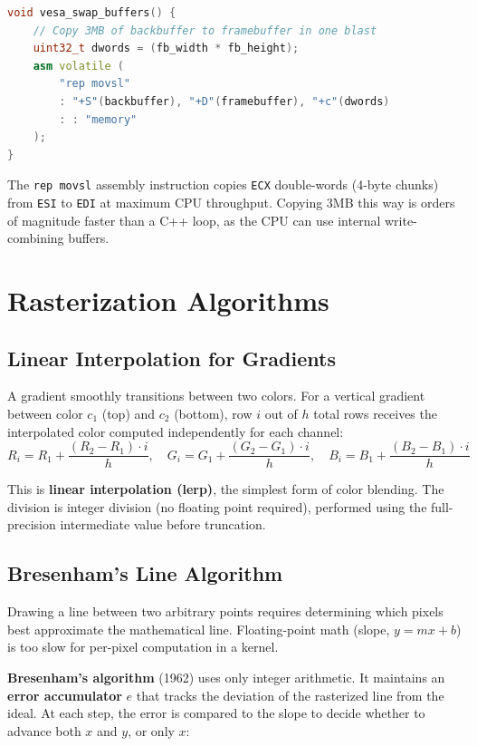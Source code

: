 \documentclass[12pt,a4paper]{report}
\begin{document}
\begin{lstlisting}[language=C++, title=kernel/vesa.cpp]
void vesa_swap_buffers() {
    // Copy 3MB of backbuffer to framebuffer in one blast
    uint32_t dwords = (fb_width * fb_height);
    asm volatile (
        "rep movsl"
        : "+S"(backbuffer), "+D"(framebuffer), "+c"(dwords)
        : : "memory"
    );
}
\end{lstlisting}

The \texttt{rep movsl} assembly instruction copies \texttt{ECX} double-words (4-byte
chunks) from \texttt{ESI} to \texttt{EDI} at maximum CPU throughput. Copying 3MB this
way is orders of magnitude faster than a C++ loop, as the CPU can use internal
write-combining buffers.

\section{Rasterization Algorithms}

\subsection{Linear Interpolation for Gradients}

A gradient smoothly transitions between two colors. For a vertical gradient between
color $c_1$ (top) and $c_2$ (bottom), row $i$ out of $h$ total rows receives the
interpolated color computed independently for each channel:
\[
R_i = R_1 + \frac{(R_2 - R_1) \cdot i}{h}, \quad G_i = G_1 + \frac{(G_2 - G_1) \cdot i}{h}, \quad B_i = B_1 + \frac{(B_2 - B_1) \cdot i}{h}
\]

This is \textbf{linear interpolation (lerp)}, the simplest form of color blending.
The division is integer division (no floating point required), performed using the
full-precision intermediate value before truncation.

\subsection{Bresenham's Line Algorithm}

Drawing a line between two arbitrary points requires determining which pixels best
approximate the mathematical line. Floating-point math (slope, $y = mx + b$) is too
slow for per-pixel computation in a kernel.

\textbf{Bresenham's algorithm} (1962) uses only integer arithmetic. It maintains an
\textbf{error accumulator} $e$ that tracks the deviation of the rasterized line from
the ideal. At each step, the error is compared to the slope to decide whether to
advance both $x$ and $y$, or only $x$:
\end{document}
